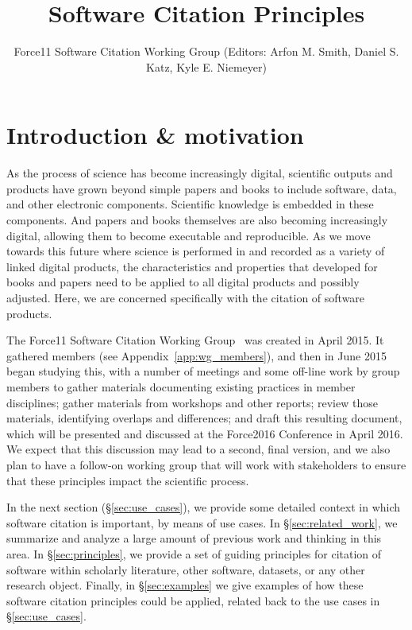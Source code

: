 \documentclass[11pt, oneside]{amsart}
\title{Software Citation Principles}
\author{Force11 Software Citation Working Group (Editors: Arfon M. Smith, Daniel S. Katz, Kyle E. Niemeyer)}
\date{}
\begin{document}
\begin{abstract}
\end{abstract}

\maketitle


\section{Introduction \& motivation}
\label{sec:intro}

As the process of science has become increasingly digital, scientific outputs and products have
grown beyond simple papers and books to include software, data, and other electronic
components.  Scientific knowledge is embedded in these components.  And papers and books
themselves are also becoming increasingly digital, allowing them to become executable
and reproducible.  As we move towards this future where science is performed in and recorded
as a variety of linked digital products, the characteristics and properties that developed for
books and papers need to be applied to all digital products and possibly adjusted.  Here, we are concerned specifically
with the citation of software products.

The Force11 Software Citation Working Group~\cite{f11scwg} was created in April 2015.
It gathered members (see Appendix~\ref{app:wg_members}), and then in June 2015 began studying this, with a number of meetings
and some off-line work by group members to gather materials documenting existing
practices in member disciplines; gather materials from workshops and other reports;
review those materials, identifying overlaps and differences; and draft this resulting document,
which will be presented and discussed at the Force2016 Conference \cite{force2016}
in April 2016.  We expect that
this discussion may lead to a second, final version, and we also
plan to have a follow-on working group that will work with stakeholders to ensure that
these principles impact the scientific process.

In the next section (\S\ref{sec:use_cases}), we provide some detailed context in which
software citation is important, by means of use cases.  In \S\ref{sec:related_work}, we
summarize and analyze a large amount of previous work and thinking in this area.  In
\S\ref{sec:principles}, we provide a set of guiding principles for citation of software within
scholarly literature, other software, datasets, or any other research object.  Finally,
in \S\ref{sec:examples} we give examples of how these software citation principles
could be applied, related back to the use cases in \S\ref{sec:use_cases}.
\end{document}
